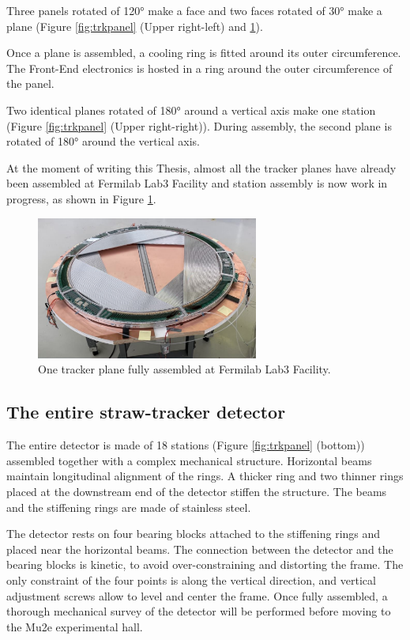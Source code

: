 Three panels rotated of 120° make a face and two faces rotated of 
30° make a plane (Figure \ref{fig:trkpanel} (Upper right-left) and \ref{fig:trueplane}).

Once a plane is assembled, a cooling ring is fitted around its outer circumference. 
The Front-End electronics is hosted in a ring around the outer 
circumference of the panel.

Two identical planes rotated of 180° around a vertical axis make one station 
(Figure \ref{fig:trkpanel} (Upper right-right)). 
During assembly, the second plane is rotated of 180° around the vertical axis.

At the moment of writing this Thesis, almost all the tracker planes have 
already been assembled at Fermilab Lab3 Facility and station assembly is now work in progress, 
as shown in Figure \ref{fig:trueplane}.

\begin{figure}[!h]
    \centering
    \includegraphics[width =0.65\textwidth]{figures/png/Screenshot_20240706_163056.png}
    \caption[One tracker plane fully assembled.]{One tracker plane fully assembled at Fermilab Lab3 Facility.}
    \label{fig:trueplane}
\end{figure}
\subsection{The entire straw-tracker detector}

The entire detector is made of 18 stations (Figure \ref{fig:trkpanel} 
(bottom)) assembled together with a complex mechanical structure. 
Horizontal beams maintain longitudinal alignment of the rings. 
A thicker ring and two thinner rings placed at the downstream end 
of the detector stiffen the structure. The beams and the stiffening rings 
are made of stainless steel.

The detector rests on four bearing blocks attached to the 
stiffening rings and placed near the horizontal beams.
The connection between the detector and the bearing blocks 
is kinetic, to avoid over-constraining and distorting the frame. 
The only constraint of the four points is along the vertical 
direction, and vertical adjustment screws allow to level and 
center the frame. Once fully assembled, a thorough mechanical 
survey of the detector will be performed before moving to the Mu2e experimental hall. 

